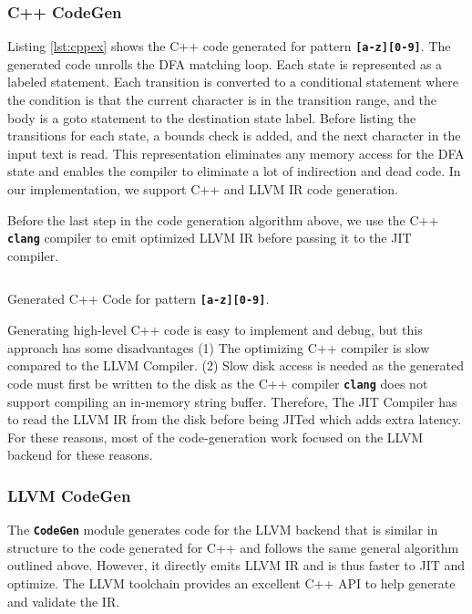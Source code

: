 \subsubsection{C++ CodeGen}
Listing \ref{lst:cppex} shows the C++ code generated for pattern \texttt{\textbf{[a-z][0-9]}}. The generated code unrolls the DFA matching loop. Each state is represented as a labeled statement. Each transition is converted to a conditional statement where the condition is that the current character is in the transition range, and the body is a goto statement to the destination state label. Before listing the transitions for each state, a bounds check is added, and the next character in the input text is read. This representation eliminates any memory access for the DFA state and enables the compiler to eliminate a lot of indirection and dead code. In our implementation, we support C++ and LLVM IR code generation.

Before the last step in the code generation algorithm above, we use the C++ \texttt{\textbf{clang}} compiler to emit optimized LLVM IR before passing it to the JIT compiler.

\begin{listing}[htbp]
\inputminted[breaklines,frame=lines,linenos]{cpp}{code/ex.cpp}
\caption{Generated C++ Code for pattern \texttt{\textbf{[a-z][0-9]}}.}\label{lst:cppex}
\end{listing}

Generating high-level C++ code is easy to implement and debug, but this approach has some disadvantages (1) The optimizing C++ compiler is slow compared to the LLVM Compiler. (2) Slow disk access is needed as the generated code must first be written to the disk as the C++ compiler \texttt{\textbf{clang}} does not support compiling an in-memory string buffer. Therefore, The JIT Compiler has to read the LLVM IR from the disk before being JITed which adds extra latency. For these reasons, most of the code-generation work focused on the LLVM backend for these reasons.

\subsubsection{LLVM CodeGen}
The \texttt{\textbf{CodeGen}} module generates code for the LLVM backend that is similar in structure to the code generated for C++ and follows the same general algorithm outlined above. However, it directly emits LLVM IR and is thus faster to JIT and optimize. The LLVM toolchain provides an excellent C++ API \cite{llvmapi} to help generate and validate the IR.

